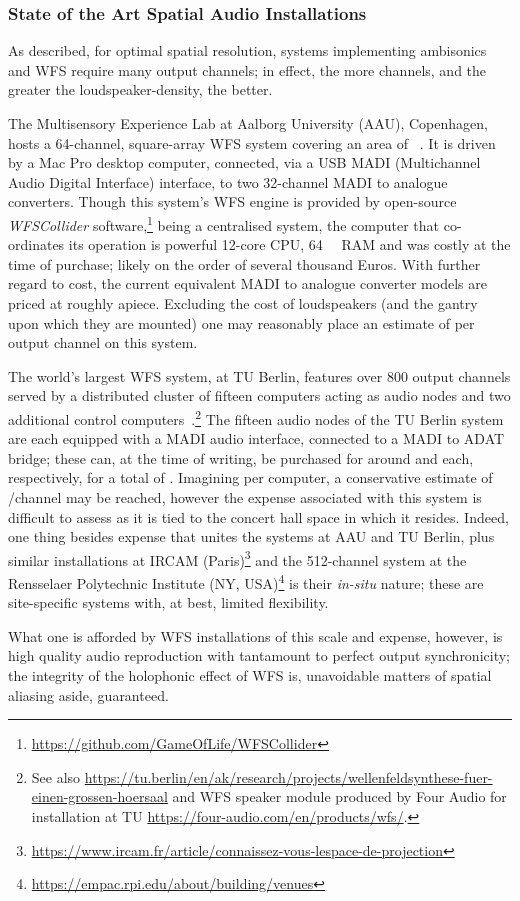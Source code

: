 \subsubsection{State of the Art Spatial Audio Installations}
\label{subsubsec:spatial-sota}

As described, for optimal spatial resolution, systems implementing ambisonics
and WFS require many output channels; in effect, the more channels, and the
greater the loudspeaker-density, the better.

The Multisensory Experience Lab at Aalborg University (AAU), Copenhagen, hosts
a 64-channel, square-array WFS system covering an area of
~\citep{grani_gestural_2016}.
It is driven by a Mac Pro desktop computer, connected, via a USB MADI
(Multichannel Audio Digital Interface) interface, to two 32-channel MADI to
analogue converters.
Though this system's WFS engine is provided by open-source \textit{WFSCollider}
software,\footnote{\url{https://github.com/GameOfLife/WFSCollider}} being a
centralised system, the computer that co-ordinates its operation is powerful
\textemdash{} 12-core CPU, \qty{64}{\giga\byte} RAM \textemdash{} and was costly
at the time of purchase; likely on the order of several thousand Euros.
With further regard to cost, the current equivalent MADI to analogue converter
models are priced at roughly  apiece.
Excluding the cost of loudspeakers (and the gantry upon which they are mounted)
one may reasonably place an estimate of  per output channel on
this system.

The world's largest WFS system, at TU Berlin, features over 800 output channels
served by a distributed cluster of fifteen computers acting as audio nodes and
two additional control computers~\citep{baalman_renewed_2007}.\footnote{
    See also
    \url{https://tu.berlin/en/ak/research/projects/wellenfeldsynthese-fuer-einen-grossen-hoersaal}
    and WFS speaker module produced by Four Audio for installation at TU
    \url{https://four-audio.com/en/products/wfs/}.
}
The fifteen audio nodes of the TU Berlin system are each equipped with a MADI
audio interface, connected to a MADI to ADAT bridge;
these can, at the time of writing, be purchased for around 
and  each, respectively, for a total of
.
Imagining  per computer, a conservative estimate of
/channel may be reached, however the expense associated with this
system is difficult to assess as it is tied to the concert hall space in which
it resides.
Indeed, one thing besides expense that unites the systems at AAU and TU Berlin,
plus similar installations at IRCAM (Paris)\footnote{
    \url{https://www.ircam.fr/article/connaissez-vous-lespace-de-projection}
} and the 512-channel system at the Rensselaer Polytechnic Institute
(NY, USA)\footnote{
    \url{https://empac.rpi.edu/about/building/venues}
} is their \textit{in-situ} nature;
these are site-specific systems with, at best, limited flexibility.

What one is afforded by WFS installations of this scale and expense, however, is
high quality audio reproduction with tantamount to perfect output synchronicity;
the integrity of the holophonic effect of WFS is, unavoidable matters of spatial
aliasing aside, guaranteed.
